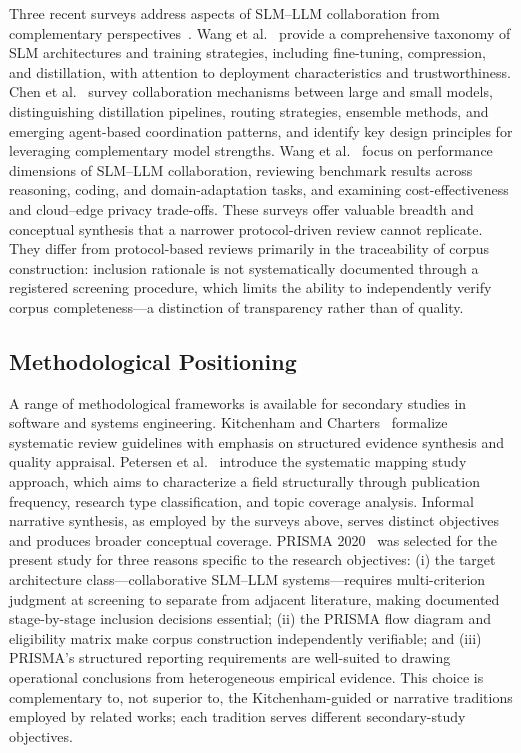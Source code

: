 Three recent surveys address aspects of SLM--LLM collaboration from complementary perspectives~\cite{wang2024slmsurvey,chen2025collabmech,wang2025collabperf}. Wang et al.~\cite{wang2024slmsurvey} provide a comprehensive taxonomy of SLM architectures and training strategies, including fine-tuning, compression, and distillation, with attention to deployment characteristics and trustworthiness. Chen et al.~\cite{chen2025collabmech} survey collaboration mechanisms between large and small models, distinguishing distillation pipelines, routing strategies, ensemble methods, and emerging agent-based coordination patterns, and identify key design principles for leveraging complementary model strengths. Wang et al.~\cite{wang2025collabperf} focus on performance dimensions of SLM--LLM collaboration, reviewing benchmark results across reasoning, coding, and domain-adaptation tasks, and examining cost-effectiveness and cloud--edge privacy trade-offs. These surveys offer valuable breadth and conceptual synthesis that a narrower protocol-driven review cannot replicate. They differ from protocol-based reviews primarily in the traceability of corpus construction: inclusion rationale is not systematically documented through a registered screening procedure, which limits the ability to independently verify corpus completeness---a distinction of transparency rather than of quality.

\subsection{Methodological Positioning}

A range of methodological frameworks is available for secondary studies in software and systems engineering. Kitchenham and Charters~\cite{kitchenham2007guidelines} formalize systematic review guidelines with emphasis on structured evidence synthesis and quality appraisal. Petersen et al.~\cite{petersen2008systematic} introduce the systematic mapping study approach, which aims to characterize a field structurally through publication frequency, research type classification, and topic coverage analysis. Informal narrative synthesis, as employed by the surveys above, serves distinct objectives and produces broader conceptual coverage. PRISMA 2020~\cite{page2021prisma} was selected for the present study for three reasons specific to the research objectives: (i) the target architecture class---collaborative SLM--LLM systems---requires multi-criterion judgment at screening to separate from adjacent literature, making documented stage-by-stage inclusion decisions essential; (ii) the PRISMA flow diagram and eligibility matrix make corpus construction independently verifiable; and (iii) PRISMA's structured reporting requirements are well-suited to drawing operational conclusions from heterogeneous empirical evidence. This choice is complementary to, not superior to, the Kitchenham-guided or narrative traditions employed by related works; each tradition serves different secondary-study objectives.

